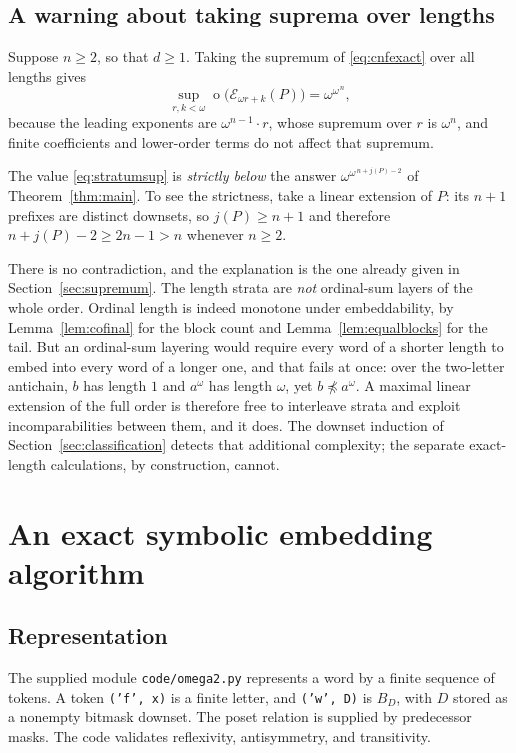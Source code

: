 \documentclass[11pt,a4paper]{article}
\numberwithin{equation}{section}
\theoremstyle{definition}
\theoremstyle{remark}
\newcommand{\mot}{\mathop{o}}
\newcommand{\emb}{\preccurlyeq}
\newcommand{\E}{\mathcal E}
\begin{document}
\subsection{A warning about taking suprema over lengths}
\label{sec:stratumwarning}

Suppose $n\ge2$, so that $d\ge1$. Taking the supremum of \eqref{eq:cnfexact}
over all lengths gives
\begin{equation}\label{eq:stratumsup}
 \sup_{r,k<\omega}\mot\bigl(\E_{\omega r+k}(P)\bigr)=\omega^{\omega^{\,n}},
\end{equation}
because the leading exponents are $\omega^{n-1}\cdot r$, whose supremum over
$r$ is $\omega^{n}$, and finite coefficients and lower-order terms do not
affect that supremum.

The value \eqref{eq:stratumsup} is \emph{strictly below} the answer
$\omega^{\omega^{\,n+j(P)-2}}$ of Theorem~\ref{thm:main}. To see the
strictness, take a linear extension of $P$: its $n+1$ prefixes are distinct
downsets, so $j(P)\ge n+1$ and therefore $n+j(P)-2\ge 2n-1>n$ whenever
$n\ge2$.

There is no contradiction, and the explanation is the one already given in
Section~\ref{sec:supremum}. The length strata are \emph{not} ordinal-sum
layers of the whole order. Ordinal length is indeed monotone under
embeddability, by Lemma~\ref{lem:cofinal} for the block count and
Lemma~\ref{lem:equalblocks} for the tail. But an ordinal-sum layering would
require every word of a shorter length to embed into every word of a longer
one, and that fails at once: over the two-letter antichain, $b$ has length $1$
and $a^\omega$ has length $\omega$, yet $b\not\emb a^\omega$. A maximal linear
extension of the full order is therefore free to interleave strata and exploit
incomparabilities between them, and it does. The downset induction of
Section~\ref{sec:classification} detects that additional complexity; the
separate exact-length calculations, by construction, cannot.

\section{An exact symbolic embedding algorithm}
\label{sec:algorithm}

\subsection{Representation}
The supplied module \texttt{code/omega2.py} represents a word by a finite
sequence of tokens. A token \texttt{('f', x)} is a finite letter, and
\texttt{('w', D)} is $B_D$, with $D$ stored as a nonempty bitmask downset.
The poset relation is supplied by predecessor masks. The code validates
reflexivity, antisymmetry, and transitivity.
\end{document}
